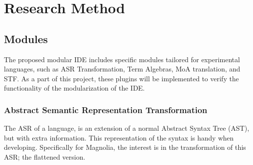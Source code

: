 \chapter{Research Method}

\section{Modules}

The proposed modular IDE includes specific modules tailored for experimental
languages, such as ASR Transformation, Term Algebras, MoA translation, and STF.
As a part of this project, these plugins will be implemented to verify the
functionality of the modularization of the IDE.

\subsection{Abstract Semantic Representation Transformation}

The ASR of a language, is an extension of a normal Abstract Syntax Tree (AST),
but with extra information. This representation of the syntax is handy when
developing. Specifically for Magnolia, the interest is in the transformation of
this ASR; the flattened version.
